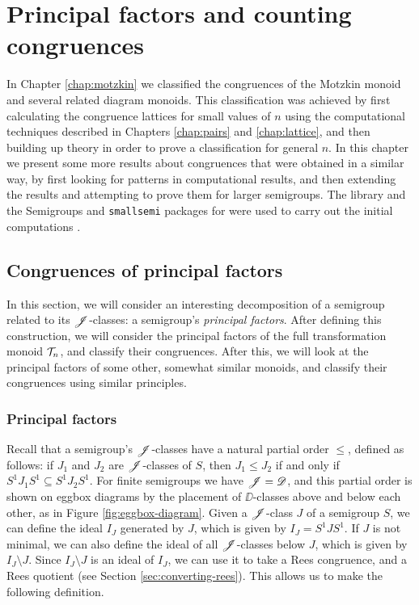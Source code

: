 \chapter{Principal factors and counting congruences}
\label{chap:other}

In Chapter \ref{chap:motzkin} we classified the congruences of the Motzkin
monoid and several related diagram monoids.  This classification was achieved by
first calculating the congruence lattices for small values of $n$ using the
computational techniques described in Chapters \ref{chap:pairs} and
\ref{chap:lattice}, and then building up theory in order to prove a
classification for general $n$.  In this chapter we present some more results
about congruences that were obtained in a similar way, by first looking for
patterns in computational results, and then extending the results and attempting
to prove them for larger semigroups.  The \libsemigroups{} library and the
Semigroups and \texttt{smallsemi} packages for \GAP{} were used to carry out the
initial computations \cite{libsemigroups, semigroups, smallsemi, gap}.

\section{Congruences of principal factors}
\label{sec:princfact}

In this section, we will consider an interesting decomposition of a semigroup
related to its $\mathrel{\mathscr{J}}$-classes: a semigroup's \textit{principal factors}.  After
defining this construction, we will consider the principal factors of the full
transformation monoid $\mathcal{T}_n$, and classify their congruences.  After this, we
will look at the principal factors of some other, somewhat similar monoids, and
classify their congruences using similar principles.

\subsection{Principal factors}
\label{sec:princfact-def}

Recall that a semigroup's $\mathrel{\mathscr{J}}$-classes have a natural partial order $\leq$,
defined as follows: if $J_1$ and $J_2$ are $\mathrel{\mathscr{J}}$-classes of $S$, then
$J_1 \leq J_2$ if and only if $S^1 J_1 S^1 \subseteq S^1 J_2 S^1$.  For finite
semigroups we have $\mathscr{J}=\mathscr{D}$, and this partial order is shown on eggbox diagrams
by the placement of $\DD$-classes above and below each other, as in Figure
\ref{fig:eggbox-diagram}.  Given a $\mathrel{\mathscr{J}}$-class $J$ of a semigroup $S$, we can
define the ideal $I_J$ generated by $J$, which is given by $I_J = S^1 J S^1$.
If $J$ is not minimal, we can also define the ideal of all $\mathrel{\mathscr{J}}$-classes below
$J$, which is given by $I_J \setminus J$.  Since $I_J \setminus J$ is an ideal
of $I_J$, we can use it to take a Rees congruence, and a Rees quotient (see
Section \ref{sec:converting-rees}).  This allows us to make the following
definition. %

